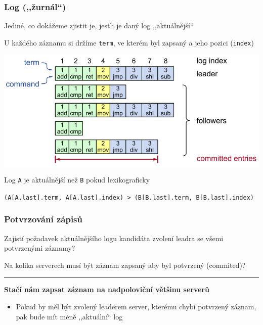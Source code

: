 \documentclass[usenames,dvipsnames,9pt]{beamer}
\begin{document}
\begin{frame}[fragile]
  \frametitle{Log (,,žurnál``)}

  {\large Jediné, co dokážeme zjistit je, jestli je daný log ,,aktuálnější``}

  \hfill
  \begin{minipage}{0.53\linewidth}
    U každého záznamu si držíme \texttt{term}, ve kterém byl zapsaný a jeho pozici (\texttt{index})
  \end{minipage}

  \begin{center}
	  \colorbox{white}{\includegraphics[width=0.7\linewidth]{12/figs/log.png}}
  \end{center}

  \pause\vspace{1em}
  Log \texttt{A} je aktuálnější než \texttt{B} pokud lexikograficky
  \begin{center}
    \footnotesize\texttt{(A[A.last].term, A[A.last].index) > (B[B.last].term, B[B.last].index)}
  \end{center}
\end{frame}

\begin{frame}
  \frametitle{Potvrzování zápisů}

  {\large Zajistí požadavek aktuálnějšího logu kandidáta zvolení leadra se všemi potvrzenými záznamy?}

  \begin{center}
    \LARGE Na kolika serverech musí být záznam zapsaný aby byl potvrzený (commited)?
  \end{center}

  \pause\vspace{2em}\hrule\vspace{2em}

  {\bf \faWarning \hspace{3pt} Stačí nám zapsat záznam na nadpoloviční většinu serverů}
  \begin{itemize}
    \item Pokud by měl být zvolený leaderem server, kterému chybí potvrzený záznam, pak bude mít méně ,,aktuální`` log
  \end{itemize}
\end{frame}
\end{document}
